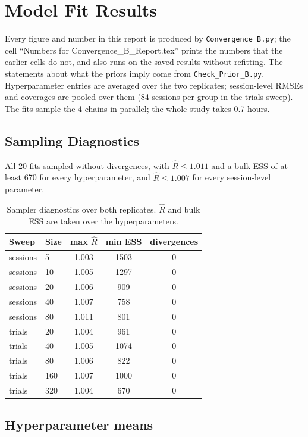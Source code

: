 \documentclass[11pt]{article}
\newcommand{\code}[1]{\texttt{#1}}
\begin{document}
\section{Model Fit Results}

Every figure and number in this report is produced by \code{Convergence\_B.py};
the cell ``Numbers for Convergence\_B\_Report.tex'' prints the numbers that the
earlier cells do not, and also runs on the saved results without refitting. The
statements about what the priors imply come from \code{Check\_Prior\_B.py}.
Hyperparameter entries are averaged over the two replicates; session-level RMSEs and
coverages are pooled over them (84 sessions per group in the trials sweep). The fits
sample the 4 chains in parallel; the whole study takes 0.7 hours.

\subsection{Sampling Diagnostics}
All 20 fits sampled without divergences, with $\hat{R} \le 1.011$ and a bulk ESS of at
least 670 for every hyperparameter, and $\hat{R} \le 1.007$ for every session-level
parameter.

\begin{table}[H]
\centering
\caption{Sampler diagnostics over both replicates. $\hat{R}$ and bulk ESS are
taken over the hyperparameters.}
\begin{tabular}{llccc}
\toprule
Sweep & Size & max $\hat{R}$ & min ESS & divergences \\
\midrule
sessions & 5   & 1.003 & 1503 & 0 \\
sessions & 10  & 1.005 & 1297 & 0 \\
sessions & 20  & 1.006 & 909  & 0 \\
sessions & 40  & 1.007 & 758  & 0 \\
sessions & 80  & 1.011 & 801  & 0 \\
\midrule
trials & 20  & 1.004 & 961  & 0 \\
trials & 40  & 1.005 & 1074 & 0 \\
trials & 80  & 1.006 & 822  & 0 \\
trials & 160 & 1.007 & 1000 & 0 \\
trials & 320 & 1.004 & 670  & 0 \\
\bottomrule
\end{tabular}
\end{table}

\subsection{Hyperparameter means}
\end{document}
